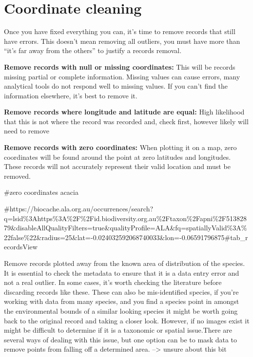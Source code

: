 \documentclass[
  letterpaper,
  DIV=11,
  numbers=noendperiod,
  oneside]{scrreprt}
\newenvironment{Shaded}{\begin{snugshade}}{\end{snugshade}}
\newcommand{\CommentTok}[1]{\textcolor[rgb]{0.37,0.37,0.37}{#1}}
\begin{document}
\hypertarget{coordinate-cleaning}{%
\section{Coordinate cleaning}\label{coordinate-cleaning}}

Once you have fixed everything you can, it's time to remove records that
still have errors. This doesn't mean removing all outliers, you must
have more than ``it's far away from the others'' to justify a records
removal.

\textbf{Remove records with null or missing coordinates:} This will be
records missing partial or complete information. Missing values can
cause errors, many analytical tools do not respond well to missing
values. If you can't find the information elsewhere, it's best to remove
it.

\textbf{Remove records where longitude and latitude are equal:} High
likelihood that this is not where the record was recorded and, check
first, however likely will need to remove

\textbf{Remove records with zero coordinates:} When plotting it on a
map, zero coordinates will be found around the point at zero latitudes
and longitudes. These records will not accurately represent their valid
location and must be removed.

\begin{Shaded}
\begin{Highlighting}[]
\CommentTok{\#zero coordinates acacia }

\CommentTok{\#https://biocache.ala.org.au/occurrences/search?q=lsid\%3Ahttps\%3A\%2F\%2Fid.biodiversity.org.au\%2Ftaxon\%2Fapni\%2F51382879\&disableAllQualityFilters=true\&qualityProfile=ALA\&fq=spatiallyValid\%3A\%22false\%22\&radius=25\&lat={-}0.024032592068740033\&lon={-}0.06591796875\#tab\_recordsView }
\end{Highlighting}
\end{Shaded}

Remove records plotted away from the known area of distribution of the
species. It is essential to check the metadata to ensure that it is a
data entry error and not a real outlier. In some cases, it's worth
checking the literature before discarding records like these. These can
also be mis-identified species, if you're working with data from many
species, and you find a species point in amongst the environmental
bounds of a similar looking species it might be worth going back to the
original record and taking a closer look. However, if no images exist it
might be difficult to determine if it is a taxonomic or spatial
issue.There are several ways of dealing with this issue, but one option
can be to mask data to remove points from falling off a determined area.
--\textgreater{} unsure about this bit
\end{document}

